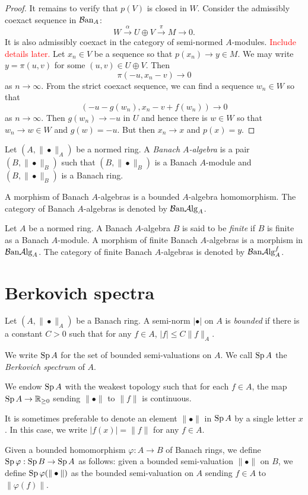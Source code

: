 \begin{proof}
    It remains to verify that $p(V)$ is closed in $W$. Consider the admissibly coexact sequence in $\mathcal{B}\mathrm{an}_A$:
    \[
      W \xrightarrow{\alpha}U\oplus V\xrightarrow{\pi} M\rightarrow 0. 
    \]
    It is also admissibly coexact in the category of semi-normed $A$-modules. \textcolor{red}{Include details later.}
    Let $x_n\in V$ be a sequence so that $p(x_n)\to y\in M$. We may write $y=\pi(u,v)$ for some $(u,v)\in U\oplus V$. Then
    \[
        \pi(-u,x_n-v)\to 0  
    \]
    as $n\to \infty$. From the strict coexact sequence, we can find a sequence $w_n\in W$ so that
    \[
        (-u-g(w_n),x_n-v+f(w_n))\to 0  
    \]
    as $n\to \infty$. Then $g(w_n)\to -u$ in $U$ and hence there is $w\in W$ so that $w_n\to w\in W$ and $g(w)=-u$. But then $x_n\to x$ and $p(x)=y$.
\end{proof}


\begin{definition}
    Let $(A,\|\bullet\|_A)$ be a normed ring. A \emph{Banach $A$-algebra} is a pair $(B,\|\bullet\|_B)$ such that $(B,\|\bullet\|_B)$ is a Banach $A$-module and $(B,\|\bullet\|_B)$ is a Banach ring.

    A morphism of Banach $A$-algebras is a bounded $A$-algebra homomorphism. The category of Banach $A$-algebras is denoted by $\mathcal{B}\mathrm{an}\mathcal{A}\mathrm{lg}_A$.
\end{definition}

\begin{definition}\label{def-finiteBanachalgebra}
    Let $A$ be a normed ring. A Banach $A$-algebra $B$ is said to be \emph{finite} if $B$ is finite as a Banach $A$-module. A morphism of finite Banach $A$-algebras is a morphism in $\mathcal{B}\mathrm{an}\mathcal{A}\mathrm{lg}_A$. The category of finite Banach $A$-algebras is denoted by $\mathcal{B}\mathrm{an}\mathcal{A}\mathrm{lg}_A^f$.
\end{definition}

\section{Berkovich spectra}


\begin{definition}\label{def-Berkspectrum}
    Let $(A,\|\bullet\|_A)$ be a Banach ring. A semi-norm $|\bullet|$ on $A$ is \emph{bounded} if there is a constant $C>0$ such that for any $f\in A$, $|f|\leq C\|f\|_A$.

    We write $\operatorname{Sp} A$ for the set of bounded semi-valuations on $A$. We call $\operatorname{Sp} A$ the \emph{Berkovich spectrum} of $A$.

    We endow $\operatorname{Sp} A$ with the weakest topology such that for each $f\in A$, the map $\operatorname{Sp} A\rightarrow \mathbb{R}_{\geq 0}$ sending $\|\bullet\|$ to $\|f\|$ is continuous.

    It is sometimes preferable to denote an element $\|\bullet\|$ in $\operatorname{Sp} A$ by a single letter $x$. In this case, we write $|f(x)|=\|f\|$ for any $f\in A$.

    Given a bounded homomorphism $\varphi:A\rightarrow B$ of Banach rings, we define $\operatorname{Sp} \varphi:\operatorname{Sp} B\rightarrow \operatorname{Sp} A$ as follows: given a bounded semi-valuation $\|\bullet\|$ on $B$, we define $\operatorname{Sp} \varphi(\|\bullet\|)$ as the bounded semi-valuation on $A$ sending $f\in A$ to $\|\varphi(f)\|$.
\end{definition}

